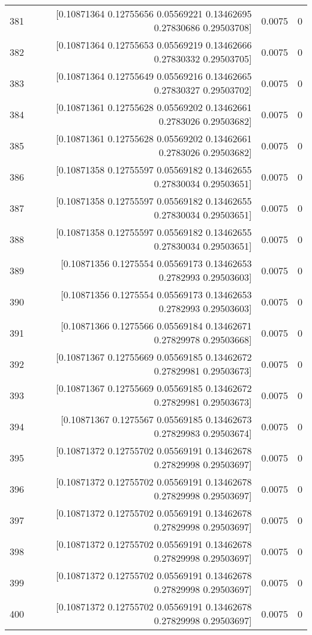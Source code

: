 \begin{longtable}{lrrr}
381 & [0.10871364 0.12755656 0.05569221 0.13462695 0.27830686 0.29503708] & 0.0075 & 0 \\
382 & [0.10871364 0.12755653 0.05569219 0.13462666 0.27830332 0.29503705] & 0.0075 & 0 \\
383 & [0.10871364 0.12755649 0.05569216 0.13462665 0.27830327 0.29503702] & 0.0075 & 0 \\
384 & [0.10871361 0.12755628 0.05569202 0.13462661 0.2783026  0.29503682] & 0.0075 & 0 \\
385 & [0.10871361 0.12755628 0.05569202 0.13462661 0.2783026  0.29503682] & 0.0075 & 0 \\
386 & [0.10871358 0.12755597 0.05569182 0.13462655 0.27830034 0.29503651] & 0.0075 & 0 \\
387 & [0.10871358 0.12755597 0.05569182 0.13462655 0.27830034 0.29503651] & 0.0075 & 0 \\
388 & [0.10871358 0.12755597 0.05569182 0.13462655 0.27830034 0.29503651] & 0.0075 & 0 \\
389 & [0.10871356 0.1275554  0.05569173 0.13462653 0.2782993  0.29503603] & 0.0075 & 0 \\
390 & [0.10871356 0.1275554  0.05569173 0.13462653 0.2782993  0.29503603] & 0.0075 & 0 \\
391 & [0.10871366 0.1275566  0.05569184 0.13462671 0.27829978 0.29503668] & 0.0075 & 0 \\
392 & [0.10871367 0.12755669 0.05569185 0.13462672 0.27829981 0.29503673] & 0.0075 & 0 \\
393 & [0.10871367 0.12755669 0.05569185 0.13462672 0.27829981 0.29503673] & 0.0075 & 0 \\
394 & [0.10871367 0.1275567  0.05569185 0.13462673 0.27829983 0.29503674] & 0.0075 & 0 \\
395 & [0.10871372 0.12755702 0.05569191 0.13462678 0.27829998 0.29503697] & 0.0075 & 0 \\
396 & [0.10871372 0.12755702 0.05569191 0.13462678 0.27829998 0.29503697] & 0.0075 & 0 \\
397 & [0.10871372 0.12755702 0.05569191 0.13462678 0.27829998 0.29503697] & 0.0075 & 0 \\
398 & [0.10871372 0.12755702 0.05569191 0.13462678 0.27829998 0.29503697] & 0.0075 & 0 \\
399 & [0.10871372 0.12755702 0.05569191 0.13462678 0.27829998 0.29503697] & 0.0075 & 0 \\
400 & [0.10871372 0.12755702 0.05569191 0.13462678 0.27829998 0.29503697] & 0.0075 & 0 \\

\end{longtable}
